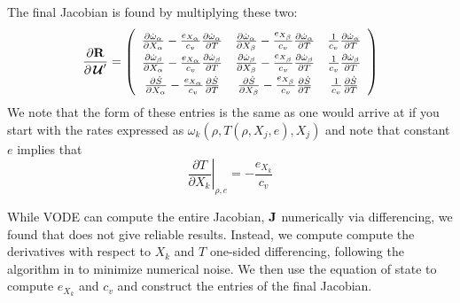 \documentclass[times,modern]{aastex63}
\newcommand{\omegadot}{\dot{\omega}}
\newcommand{\Sdot}{\dot{S}}
\newcommand{\Uc}{{\,\bm{\mathcal{U}}}}
\newcommand{\Rb}{{\bf R}}
\begin{document}
The final Jacobian is found by multiplying these two:
\begin{equation}
\renewcommand{\arraystretch}{1.5}
\frac{\partial \Rb}{\partial \Uc^\prime} = \left (
  \begin{array}{ccc}
    \frac{\partial \omegadot_\alpha}{\partial X_\alpha} - \frac{e_{X_\alpha}}{c_v} \frac{\partial \omegadot_\alpha}{\partial T} &
    \frac{\partial \omegadot_\alpha}{\partial X_\beta} - \frac{e_{X_\beta}}{c_v} \frac{\partial \omegadot_\alpha}{\partial T} &
    \frac{1}{c_v} \frac{\partial \omegadot_\alpha}{\partial T} \\
    \frac{\partial \omegadot_\beta}{\partial X_\alpha} - \frac{e_{X_\alpha}}{c_v} \frac{\partial \omegadot_\beta}{\partial T} &
    \frac{\partial \omegadot_\beta}{\partial X_\beta} - \frac{e_{X_\beta}}{c_v} \frac{\partial \omegadot_\beta}{\partial T} &
    \frac{1}{c_v} \frac{\partial \omegadot_\beta}{\partial T} \\
     \frac{\partial \Sdot}{\partial X_\alpha} -  \frac{e_{X_\alpha}}{c_v} \frac{\partial \Sdot}{\partial T} &
     \frac{\partial \Sdot}{\partial X_\beta} -  \frac{e_{X_\beta}}{c_v} \frac{\partial \Sdot}{\partial T} &
     \frac{1}{c_v} \frac{\partial \Sdot}{\partial T} \\
  \end{array}
  \right )
\renewcommand{\arraystretch}{1}
\end{equation}
We note that the form of these entries is the same as one would arrive at if you start with the rates expressed as
$\omega_k(\rho, T(\rho, X_j, e), X_j)$ and note that constant $e$ implies that
\begin{equation}
\left . \frac{\partial T}{\partial X_k} \right |_{\rho, e} = - \frac{e_{X_k}}{c_v}
\end{equation}

While VODE can compute the entire Jacobian, ${\bf J}$ numerically via
differencing, we found that does not give reliable results.  Instead,
we compute compute the derivatives with respect to $X_k$ and $T$
one-sided differencing, following the algorithm in \cite{lsode} to
minimize numerical noise.  We then use the equation of state to
compute $e_{X_k}$ and $c_v$ and construct the entries of the final
Jacobian.





\end{document}

